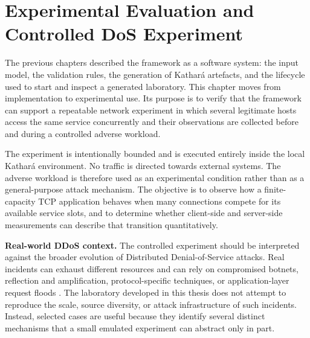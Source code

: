 \chapter{Experimental Evaluation and Controlled DoS Experiment}
\label{chap:experimental-evaluation}

The previous chapters described the framework as a software system: the input
model, the validation rules, the generation of Kathar\'a artefacts, and the
lifecycle used to start and inspect a generated laboratory. This chapter moves
from implementation to experimental use. Its purpose is to verify that the
framework can support a repeatable network experiment in which several
legitimate hosts access the same service concurrently and their observations
are collected before and during a controlled adverse workload.

The experiment is intentionally bounded and is executed entirely inside the
local Kathar\'a environment. No traffic is directed towards external systems.
The adverse workload is therefore used as an experimental condition rather
than as a general-purpose attack mechanism. The objective is to observe how a
finite-capacity TCP application behaves when many connections compete for its
available service slots, and to determine whether client-side and server-side
measurements can describe that transition quantitatively.

\noindent\textbf{Real-world DDoS context.}
The controlled experiment should be interpreted against the broader evolution
of Distributed Denial-of-Service attacks. Real incidents can exhaust different
resources and can rely on compromised botnets, reflection and amplification,
protocol-specific techniques, or application-layer request floods
\cite{rfc4732}. The laboratory developed in this thesis does not attempt to
reproduce the scale, source diversity, or attack infrastructure of such
incidents. Instead, selected cases are useful because they identify several
distinct mechanisms that a small emulated experiment can abstract only in
part.

